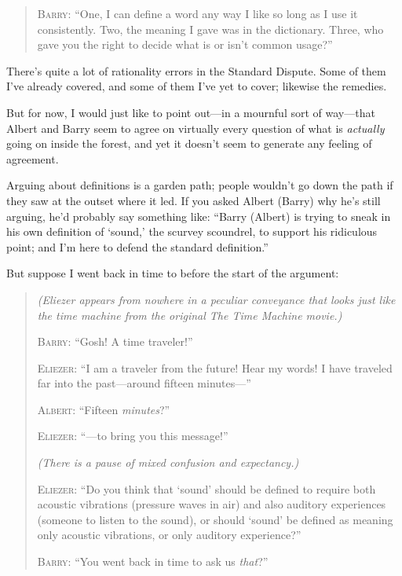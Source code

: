 {{\begin{quotation}
{
 \textsc{Barry}: ``One, I can define a word any way I like
so long as I use it consistently. Two, the meaning I gave was in the
dictionary. Three, who gave you the right to decide what is or
isn't common usage?''}
\end{quotation}

{
 There's quite a lot of rationality errors in the
Standard Dispute. Some of them I've already covered,
and some of them I've yet to cover; likewise the
remedies.}

{
 But for now, I would just like to point out---in a mournful sort
of way---that Albert and Barry seem to agree on virtually every
question of what is \textit{actually} going on inside the forest, and
yet it doesn't seem to generate any feeling of
agreement.}

{
 Arguing about definitions is a garden path; people
wouldn't go down the path if they saw at the outset
where it led. If you asked Albert (Barry) why he's
still arguing, he'd probably say something like:
``Barry (Albert) is trying to sneak in his own
definition of `sound,' the scurvey
scoundrel, to support his ridiculous point; and I'm
here to defend the standard definition.''}

{
 But suppose I went back in time to before the start of the
argument:}

\begin{quotation}
{
 \textit{(Eliezer appears from nowhere in a peculiar conveyance
that looks just like the time machine from the original The Time
Machine movie.)}}

{
 \textsc{Barry}: ``Gosh! A time
traveler!''}

{
 \textsc{Eliezer}: ``I am a traveler from the future! Hear
my words! I have traveled far into the past---around fifteen
minutes---''}

{
 \textsc{Albert}: ``Fifteen
\textit{minutes}?''}

{
 \textsc{Eliezer}: ``---to bring you this
message!''}

{
 \textit{(There is a pause of mixed confusion and expectancy.)}}

{
 \textsc{Eliezer}: ``Do you think that
`sound' should be defined to require
both acoustic vibrations (pressure waves in air) and also auditory
experiences (someone to listen to the sound), or should
`sound' be defined as meaning only
acoustic vibrations, or only auditory experience?''}

{
 \textsc{Barry}: ``You went back in time to ask us
\textit{that}?''}


\end{quotation}}}
